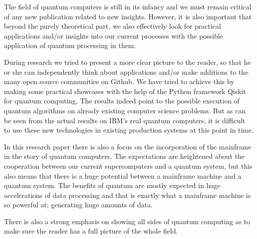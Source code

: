 The field of quantum computers is still in its infancy and we must remain critical of any new publication related to new insights. However, it is also important that beyond the purely theoretical part, we also effectively look for practical applications and/or insights into our current processes with the possible application of quantum processing in them. 

During research we tried to present a more clear picture to the reader, so that he or she can independently think about applications and/or make additions to the many open source communities on Github. We have tried to achieve this by making some practical showcases with the help of the Python framework Qiskit for quantum computing. The results indeed point to the possible execution of quantum algorithms on already existing computer science problems. But as can be seen from the actual results on IBM's real quantum computers, it is difficult to use these new technologies in existing production systems at this point in time. 

In this  research paper there is also a focus on the incorporation of the mainframe in the story of quantum computers. The expectations are heightened about the cooperation between our current supercomputers and a quantum system, but this also means that there is a huge potential between a mainframe machine and a quantum system. The benefits of quantum are mostly expected in huge accelerations of data processing and that is exactly what a mainframe machine is so powerful at; generating huge amounts of data.

There is also a strong emphasis on showing all sides of quantum computing as to make sure the reader has a full picture of the whole field.

